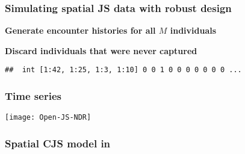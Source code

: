 \documentclass[color=usenames,dvipsnames]{beamer}
\begin{document}
\begin{frame}[fragile]
  \frametitle{Simulating spatial JS data with robust design}
{\bf Generate encounter histories for all $M$ individuals}
\footnotesize
\begin{knitrout}
\color{fgcolor}\begin{kframe}
\begin{alltt}
 \hlkwb{<-} \hlstd{(}\hlstd{,} 
  \hlopt{:}
      \hlopt{:}
          \hlopt{:}
            \hlstd{yall[i,j,}\hlopt{:}\hlstd{K,t]} \hlkwb{<-}  \hlopt{*}
        \hlstd{\}}
    \hlstd{\}}
\hlstd{\}}
\end{alltt}
\end{kframe}
\end{knitrout}
\pause
\vfill
{\bf \normalsize Discard individuals that were never captured}
\begin{knitrout}
\color{fgcolor}\begin{kframe}
\begin{alltt}
 \hlkwb{<-}  \hlopt{>} 
 \hlkwb{<-} 
\end{alltt}
\begin{verbatim}
##  int [1:42, 1:25, 1:3, 1:10] 0 0 1 0 0 0 0 0 0 0 ...
\end{verbatim}
\end{kframe}
\end{knitrout}
\end{frame}






\begin{frame}[fragile]
  \frametitle{Time series}
  \tiny

\vspace{-3mm}
\begin{center}
  \texttt{[image: Open-JS-NDR]}
\end{center}
\end{frame}



\begin{frame}[fragile]
  \frametitle{Spatial CJS model in \jags}
  \vspace{-5mm}
  \tiny \fbox{\parbox{\linewidth}{}}
\end{frame}
\end{document}
